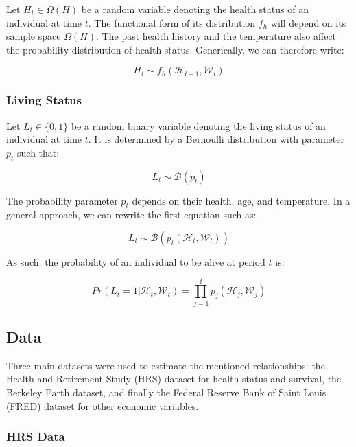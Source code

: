 \documentclass{article}
\begin{document}
Let $H_{t}\in\Omega(H)$ be a random variable denoting the health status of an individual at time $t$.
The functional form of its distribution $f_{h}$ will depend on its sample space $\Omega(H)$. 
The past health history and the temperature also affect the probability distribution of health status.
Generically, we can therefore write: 

\begin{equation}
    H_{t}\sim f_{h}(\mathcal{H}_{t-1},\mathcal{W}_t)
\end{equation}


\subsubsection{Living Status}

Let $L_{t}\in\{0,1\}$ be a random binary variable denoting the living status of an individual at time $t$.
It is determined by a Bernoulli distribution with parameter $p_t$ such that: 

\begin{equation}
    L_{t} \sim \mathcal{B}(p_{t})
\end{equation}

The probability parameter $p_{t}$ depends on their health, age, and temperature.
In a general approach, we can rewrite the first equation such as: 

\begin{equation}
    L_{t} \sim \mathcal{B}(p_{t}(\mathcal{H}_t,\mathcal{W}_t))
\end{equation}

As such, the probability of an individual to be alive at period $t$ is: 

\begin{equation}
    Pr(L_t = 1 | \mathcal{H}_t,\mathcal{W}_t ) = \prod_{j = 1}^{t} p_{j}(\mathcal{H}_j,\mathcal{W}_j)
\end{equation}

\subsection{Data}

Three main datasets were used to estimate the mentioned relationships: 
the Health and Retirement Study (HRS) dataset for
health status and survival,
the Berkeley Earth dataset,
and finally the Federal Reserve Bank of Saint Louis (FRED) dataset for 
other economic variables.

\subsubsection{HRS Data}
\end{document}
